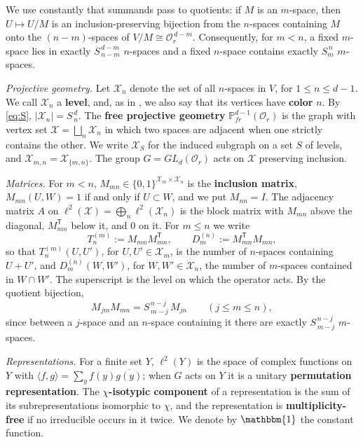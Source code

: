 \documentclass[11pt]{article}
\numberwithin{equation}{section}
\theoremstyle{plain}
\theoremstyle{definition}
\begin{document}
We use constantly that summands pass to quotients: if $M$ is an
$m$-space, then $U\mapsto U/M$ is an inclusion-preserving bijection from the $n$-spaces
containing $M$ onto the $(n-m)$-spaces of $V/M\cong \mathcal{O}_r^{\,d-m}$. Consequently, for
$m<n$, a fixed $m$-space lies in exactly $S^{\,d-m}_{\,n-m}$ $n$-spaces and a fixed $n$-space
contains exactly $S^{\,n}_{m}$ $m$-spaces.

\emph{Projective geometry.} Let $\mathcal{X}_n$ denote the set of all $n$-spaces in $V$, for $1\le n\le d-1$. We call $\mathcal{X}_n$ a \textbf{level}, and, as in \cite{LP25}, we also say that its vertices have \textbf{color} $n$. By \eqref{eq:S}, $|\mathcal{X}_n|=S^{\,d}_{\,n}$.
The \textbf{free projective geometry} $\mathbb{P}^{d-1}_{fr}(\mathcal{O}_r)$ is the graph with vertex set $\mathcal{X}=\bigsqcup_n\mathcal{X}_n$ in which two spaces are adjacent when one strictly contains the other.
We write $\mathcal{X}_S$ for the induced subgraph on a set $S$ of levels, and $\mathcal{X}_{m,n}=\mathcal{X}_{\{m,n\}}$. The group $G=GL_d(\mathcal{O}_r)$ acts on $\mathcal{X}$ preserving inclusion.

\emph{Matrices.} For $m<n$, $M_{mn}\in\{0,1\}^{\mathcal{X}_m\times \mathcal{X}_n}$ is the \textbf{inclusion matrix},
$M_{mn}(U,W)=1$ if and only if $U\subset W$, and we put $M_{nn}=I$. The adjacency
matrix $A$ on $\ell^2(\mathcal{X})=\bigoplus_n\ell^2(\mathcal{X}_n)$ is the block matrix with $M_{mn}$
above the diagonal, $M_{mn}^{\mathsf T}$ below it, and $0$ on it. For $m\le n$ we write
\[
T^{(m)}_n:=M_{mn}M_{mn}^{\mathsf T},\qquad D^{(n)}_m:=M_{mn}^{\mathsf T}M_{mn},
\]
so that $T^{(m)}_n(U,U')$, for $U,U'\in\mathcal{X}_m$, is the number of $n$-spaces containing
$U+U'$, and $D^{(n)}_m(W,W')$, for $W,W'\in\mathcal{X}_n$, the number of $m$-spaces contained
in $W\cap W'$. The superscript is
the level on which the operator acts. By the quotient bijection,
\begin{equation}\label{eq:2.2}
M_{jm}M_{mn}=S^{\,n-j}_{\,m-j}\,M_{jn}\qquad(j\le m\le n),
\end{equation}
since between a $j$-space and an $n$-space containing it there are exactly
$S^{\,n-j}_{\,m-j}$ $m$-spaces.

\emph{Representations.} For a finite set $Y$, $\ell^2(Y)$ is the space of complex functions
on $Y$ with $\langle f,g\rangle=\sum_yf(y)\overline{g(y)}$; when $G$ acts on $Y$ it is a
unitary \textbf{permutation representation}. The \textbf{$\chi$-isotypic component} of a
representation is the sum of its subrepresentations isomorphic to $\chi$, and the
representation is \textbf{multiplicity-free} if no irreducible occurs in it twice. We
denote by $\mathbbm{1}$ the constant function.
\end{document}
